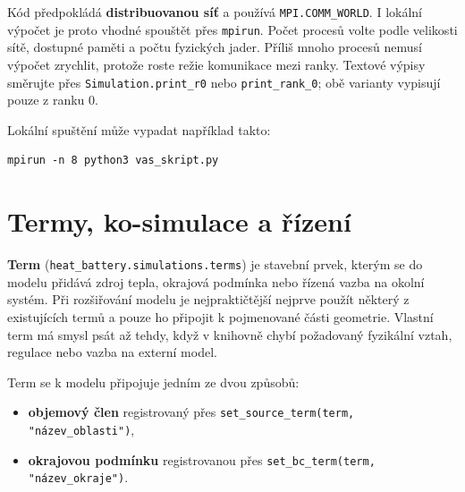 \documentclass[a4paper,11pt]{article}
\begin{document}
Kód předpokládá \textbf{distribuovanou síť} a používá \texttt{MPI.COMM\_WORLD}.
I lokální výpočet je proto vhodné spouštět přes \texttt{mpirun}. Počet procesů
volte podle velikosti sítě, dostupné paměti a počtu fyzických jader. Příliš mnoho
procesů nemusí výpočet zrychlit, protože roste režie komunikace mezi ranky.
Textové výpisy směrujte přes \texttt{Simulation.print\_r0} nebo
\texttt{print\_rank\_0}; obě varianty vypisují pouze z ranku 0.

Lokální spuštění může vypadat například takto:

\begin{lstlisting}[style=bash]
mpirun -n 8 python3 vas_skript.py
\end{lstlisting}

\section{Termy, ko-simulace a řízení}\label{sec:terms}

\textbf{Term} (\texttt{heat\_battery.simulations.terms}) je stavební prvek,
kterým se do modelu přidává zdroj tepla, okrajová podmínka nebo řízená vazba na
okolní systém. Při rozšiřování modelu je nejpraktičtější nejprve použít některý
z existujících termů a pouze ho připojit k pojmenované části geometrie. Vlastní
term má smysl psát až tehdy, když v knihovně chybí požadovaný fyzikální vztah,
regulace nebo vazba na externí model.

Term se k modelu připojuje jedním ze dvou způsobů:

\begin{itemize}
  \item \textbf{objemový člen} registrovaný přes
        \texttt{set\_source\_term(term, "název\_oblasti")},
  \item \textbf{okrajovou podmínku} registrovanou přes
        \texttt{set\_bc\_term(term, "název\_okraje")}.
\end{itemize}
\end{document}
